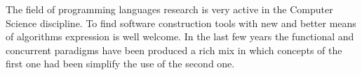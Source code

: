 
The field of programming languages research is very active in the Computer Science discipline. To find software construction tools with new and better means of algorithms expression is well welcome. In the last few years the functional and concurrent paradigms have been produced a rich mix in which concepts of the first one had been simplify the use of the second one.
